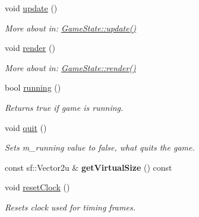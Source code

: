 \begin{DoxyCompactItemize}
\mbox{\label{class_game_engine_ae03241b464040b659b6a91f27920e8c3}} 
void \mbox{\hyperlink{class_game_engine_ae03241b464040b659b6a91f27920e8c3}{update}} ()
\begin{DoxyCompactList}\small\item\em More about in\+: \mbox{\hyperlink{class_game_state_a66b11afe355a9479f94aaf76576980bd}{Game\+State\+::update()}} \end{DoxyCompactList}\item 
\mbox{\label{class_game_engine_a267bf9164ba09e32b7a24ba4afb527d4}} 
void \mbox{\hyperlink{class_game_engine_a267bf9164ba09e32b7a24ba4afb527d4}{render}} ()
\begin{DoxyCompactList}\small\item\em More about in\+: \mbox{\hyperlink{class_game_state_a0d56cd5355f59a87cf95e1c6d719f329}{Game\+State\+::render()}} \end{DoxyCompactList}\item 
\mbox{\label{class_game_engine_ab3f9945e3cb77c3ae0a7e0c91c22c19a}} 
bool \mbox{\hyperlink{class_game_engine_ab3f9945e3cb77c3ae0a7e0c91c22c19a}{running}} ()
\begin{DoxyCompactList}\small\item\em Returns true if game is running. \end{DoxyCompactList}\item 
\mbox{\label{class_game_engine_ad82b626def2e52b28f0d6c2d167589f6}} 
void \mbox{\hyperlink{class_game_engine_ad82b626def2e52b28f0d6c2d167589f6}{quit}} ()
\begin{DoxyCompactList}\small\item\em Sets m\+\_\+running value to false, what quits the game. \end{DoxyCompactList}\item 
\mbox{\label{class_game_engine_a77d8443f4919f8eca96acfb40e6b64bd}} 
const sf\+::\+Vector2u \& {\bfseries get\+Virtual\+Size} () const
\item 
\mbox{\label{class_game_engine_a0f906c0e3c093e66abf1d387767d2a24}} 
void \mbox{\hyperlink{class_game_engine_a0f906c0e3c093e66abf1d387767d2a24}{reset\+Clock}} ()
\begin{DoxyCompactList}\small\item\em Resets clock used for timing frames. \end{DoxyCompactList}\item 

\end{DoxyCompactItemize}
